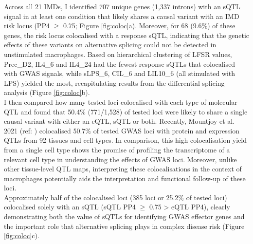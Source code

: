 Across all 21 IMDs, I identified 707 unique genes (1,337 introns) with an sQTL signal in at least one condition that likely shares a causal variant with an IMD risk locus (PP4 $\geq$ 0.75; Figure \ref{fig:coloc}a). Moreover, for 68 (9.6\%) of these genes, the risk locus colocalised with a response sQTL, indicating that the genetic effects of these variants on alternative splicing could not be detected in unstimulated macrophages. Based on hierarchical clustering of LFSR values, Prec\_D2, IL4\_6 and IL4\_24 had the fewest response sQTLs that colocalised with GWAS signals, while sLPS\_6, CIL\_6 and LIL10\_6 (all stimulated with LPS) yielded the most, recapitulating results from the differential splicing analysis (Figure \ref{fig:coloc}b). \\

I then compared how many tested loci colocalised with each type of molecular QTL and found that 50.4\% (771/1,528) of tested loci were likely to share a single causal variant with either an eQTL, sQTL or both. Recently, Mountjoy et al. 2021 (ref: \cite{Mountjoy2021-fc}) colocalised 50.7\% of tested GWAS loci with protein and expression QTLs from 92 tissues and cell types. In comparison, this high colocalisation yield from a single cell type shows the promise of profiling the transcriptome of a relevant cell type in understanding the effects of GWAS loci. Moreover, unlike other tissue-level QTL maps, interpreting these colocalisations in the context of macrophages potentially aids the interpretation and functional follow-up of these loci. \\

Approximately half of the colocalised loci (385 loci or 25.2\% of tested loci) colocalised solely with an sQTL (sQTL PP4 $\geq$ 0.75 > eQTL PP4), clearly demonstrating both the value of sQTLs for identifying GWAS effector genes and the important role that alternative splicing plays in complex disease risk (Figure \ref{fig:coloc}c). \\

